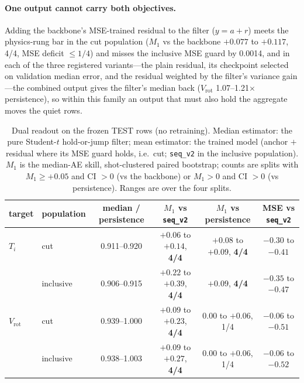 \documentclass[10pt]{article}
\newcommand{\Ti}{\ensuremath{T_i}}
\newcommand{\Vrot}{\ensuremath{V_\mathrm{rot}}}
\newcommand{\seqv}{\texttt{seq\_v2}}
\begin{document}
\paragraph{One output cannot carry both objectives.} Adding the backbone's
MSE-trained residual to the filter ($y = a + r$) meets the physics-rung bar in the
cut population ($M_1$ vs the backbone $+0.077$ to $+0.117$, 4/4, MSE deficit
$\le 1/4$) and misses the inclusive MSE guard by 0.0014, and in each of the three
registered variants---the plain residual, its checkpoint selected on validation
median error, and the residual weighted by the filter's variance gain---the combined
output gives the filter's median back (\Vrot{} 1.07--1.21$\times$ persistence), so
within this family an output that must also hold the aggregate moves the quiet rows.

\begin{table}[t]
  \centering
  \caption{Dual readout on the frozen TEST rows (no retraining). Median estimator:
  the pure Student-$t$ hold-or-jump filter; mean estimator: the trained model
  (anchor $+$ residual where its MSE guard holds, i.e.\ cut; \seqv{} in the
  inclusive population). $M_1$ is the median-AE skill, shot-clustered paired
  bootstrap; counts are splits with $M_1 \ge +0.05$ and CI $> 0$ (vs the
  backbone) or $M_1 > 0$ and CI $> 0$ (vs persistence). Ranges are over the four
  splits.}
  \label{tab:dual}
  \small
  \begin{tabular}{llcccc}
    \toprule
    target & population & median / persistence & $M_1$ vs \seqv{} & $M_1$ vs persistence & MSE vs \seqv{} \\
    \midrule
    \Ti{}   & cut       & 0.911--0.920 & $+0.06$ to $+0.14$, \textbf{4/4} & $+0.08$ to $+0.09$, \textbf{4/4} & $-0.30$ to $-0.41$ \\
            & inclusive & 0.906--0.915 & $+0.22$ to $+0.39$, \textbf{4/4} & $+0.09$, \textbf{4/4} & $-0.35$ to $-0.47$ \\
    \Vrot{} & cut       & 0.939--1.000 & $+0.09$ to $+0.23$, \textbf{4/4} & $0.00$ to $+0.06$, 1/4 & $-0.06$ to $-0.51$ \\
            & inclusive & 0.938--1.003 & $+0.09$ to $+0.27$, \textbf{4/4} & $0.00$ to $+0.06$, 1/4 & $-0.06$ to $-0.52$ \\
    \bottomrule
  \end{tabular}
\end{table}
\end{document}
